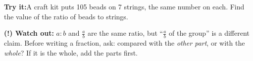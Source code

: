 \documentclass[12pt]{article}
\begin{document}
\begin{tryitbox}
\textbf{Try it:}\quad A craft kit puts 105 beads on 7 strings, the same number
on each. Find the value of the ratio of beads to strings.\\[2pt]
\end{tryitbox}

\begin{watchoutbox}
\textbf{(!) Watch out:} $a:b$ and $\frac{a}{b}$ are the same ratio, but
``$\frac{a}{b}$ of the group'' is a different claim. Before writing a fraction,
ask: compared with the \emph{other part}, or with the \emph{whole}? If it is
the whole, add the parts first.
\end{watchoutbox}
\end{document}
